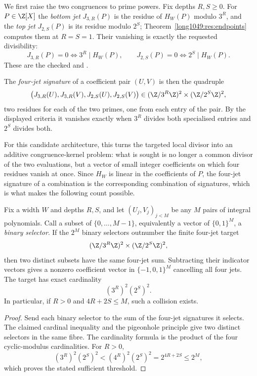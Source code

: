 We first raise the two congruences to prime powers.  Fix depths \(R,S\ge0\).
For \(P\in\Z[X]\) the \emph{bottom jet} \(J_{3,R}(P)\) is the residue of
\(H_W(P)\) modulo \(3^R\), and the \emph{top jet} \(J_{2,S}(P)\) is its residue
modulo \(2^S\); Theorem~\ref{long1049:res:endpoints} computes them at \(R=S=1\).  Their
vanishing is exactly the requested divisibility:
\[
 J_{3,R}(P)=0\iff 3^R\mid H_W(P),\qquad
 J_{2,S}(P)=0\iff 2^S\mid H_W(P).
\]
These are the checked
 and
.

The \emph{four-jet signature} of a coefficient pair
\((U,V)\) is then the quadruple
\[
 \bigl(J_{3,R}(U),J_{3,R}(V),J_{2,S}(U),J_{2,S}(V)\bigr)
 \in(\Z/3^R\Z)^2\times(\Z/2^S\Z)^2 ,
\]
two residues for each of the two primes, one from each entry of the pair.  By
the displayed criteria it vanishes exactly when \(3^R\) divides both specialised
entries and \(2^S\) divides both.

For this candidate architecture, this turns the targeted local divisor into an additive
congruence-kernel problem: what is sought is no longer a common divisor of
the two evaluations, but a vector of small integer coefficients on which four
residues vanish at once.  Since \(H_W\) is linear in the coefficients of \(P\),
the four-jet signature of a combination is the corresponding combination of
signatures, which is what makes the following count possible.

\begin{theorem}\label{long1049:res:jetkernel}
Fix a width \(W\) and depths \(R,S\), and let \((U_j,V_j)_{j<M}\) be any \(M\)
pairs of integral polynomials.  Call a subset of \(\{0,\dots,M-1\}\), equivalently
a vector of \(\{0,1\}^M\), a \emph{binary selector}.  If the
\(2^M\) binary selectors outnumber the finite four-jet target
\[
 (\Z/3^R\Z)^2\times(\Z/2^S\Z)^2,
\]
then two distinct subsets have the same four-jet sum.  Subtracting their
indicator vectors gives a nonzero coefficient vector in
\(\{-1,0,1\}^M\) cancelling all four jets.  The target has exact cardinality
\[
 (3^R)^2(2^S)^2.
\]
In particular, if \(R>0\) and \(4R+2S\le M\), such a collision exists.
\end{theorem}

\begin{proof}
Send each binary selector to the sum of the four-jet signatures it selects.
The claimed cardinal inequality and the pigeonhole principle give two
distinct selectors in the same fibre.  The cardinality formula is the product
of the four cyclic-modulus cardinalities.  For \(R>0\),
\[
 (3^R)^2(2^S)^2<(4^R)^2(2^S)^2=2^{4R+2S}\le2^M,
\]
which proves the stated sufficient threshold.
\end{proof}

